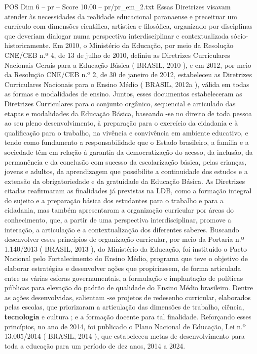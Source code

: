 \begin{textsample}{POS Dim 6 – pr – Score 10.00 – pr/pr\_em\_2.txt}
Essas Diretrizes visavam atender às necessidades da realidade educacional paranaense e preceituar um currículo com dimensões científica, artística e filosófica, organizado por disciplinas que deveriam dialogar numa perspectiva interdisciplinar e contextualizada sócio-historicamente.
Em 2010, o Ministério da Educação, por meio da Resolução CNE/CEB n.º 4, de 13 de julho de 2010, definiu as Diretrizes Curriculares Nacionais Gerais para a Educação Básica ( BRASIL, 2010 ), e em 2012, por meio da Resolução CNE/CEB n.º 2, de 30 de janeiro de 2012, estabeleceu as Diretrizes Curriculares Nacionais para o Ensino Médio ( BRASIL, 2012a ), válida em todas as formas e modalidades de ensino.
Juntos, esses documentos estabeleceram as Diretrizes Curriculares para o conjunto orgânico, sequencial e articulado das etapas e modalidades da Educação Básica, baseando -se no direito de toda pessoa ao seu pleno desenvolvimento, à preparação para o exercício da cidadania e à qualificação para o trabalho, na vivência e convivência em ambiente educativo, e tendo como fundamento a responsabilidade que o Estado brasileiro, a família e a sociedade têm em relação à garantia da democratização do acesso, da inclusão, da permanência e da conclusão com sucesso da escolarização básica, pelas crianças, jovens e adultos, da aprendizagem que possibilite a continuidade dos estudos e a extensão da obrigatoriedade e da gratuidade da Educação Básica.
As Diretrizes citadas reafirmaram as finalidades já previstas na LDB, como a formação integral do sujeito e a preparação básica dos estudantes para o trabalho e para a cidadania, mas também apresentaram a organização curricular por áreas do conhecimento, que, a partir de uma perspectiva interdisciplinar, promove a interação, a articulação e a contextualização dos diferentes saberes.
Buscando desenvolver esses princípios de organização curricular, por meio da Portaria n.º 1.140/2013 ( BRASIL, 2013 ), do Ministério da Educação, foi instituído o Pacto Nacional pelo Fortalecimento do Ensino Médio, programa que teve o objetivo de elaborar estratégias e desenvolver ações que propiciassem, de forma articulada entre as várias esferas governamentais, a formulação e implantação de políticas públicas para elevação do padrão de qualidade do Ensino Médio brasileiro.
Dentre as ações desenvolvidas, salientam -se projetos de redesenho curricular, elaborados pelas escolas, que priorizaram a articulação das dimensões de trabalho, ciência, \textbf{tecnologia} e cultura ; e a formação docente para tal finalidade.
Reforçando esses princípios, no ano de 2014, foi publicado o Plano Nacional de Educação, Lei n.º 13.005/2014 ( BRASIL, 2014 ), que estabeleceu metas de desenvolvimento para toda a educação para um período de dez anos, 2014 a 2024.

\end{textsample}
